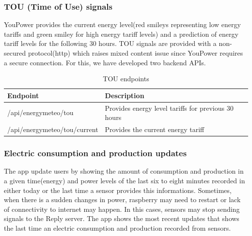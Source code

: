 \subsubsection{TOU (Time of Use) signals}
YouPower provides the current energy level(red smileys representing  low energy  tariffs and green smiley for high energy tariff levels) and a prediction of energy tariff levels for the following 30 hours. TOU signals are provided with a non-secured protocol(http) which raises mixed content issue since YouPower requires a secure connection. For this, we have developed two backend APIs.

\begin{table}[h!]
\caption{TOU endpoints}\label{tab:app_nav}
\begin{center} \footnotesize 
\begin{tabular}{ l p{6cm}}
\hline
\textbf{Endpoint}  &
\textbf{Description}  \\ \hline

/api/energymeteo/tou  & 
Provides energy level tariffs for previous 30 hours
\\ 
/api/energymeteo/tou/current & Provides the current energy tariff \\ 
 \hline
\end{tabular}
\end{center} 
\end{table}

\subsubsection{Electric consumption and production updates}
The app update users by showing the amount of consumption and production in a given time(energy) and power levels of the last six to eight minutes recorded in either today or the last time a sensor provides this informations. Sometimes, when there is a sudden changes in power, raspberry may need  to restart or  lack of connectivity to internet may happen. In this cases, sensors may stop sending signals to the Reply server. The app shows the most recent updates that shows the last time an electric consumption and production recorded from sensors.

